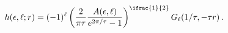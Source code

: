 \[\mathop{h\/}\nolimits\!\left(\epsilon,\ell;r\right)=(-1)^{\ell}\left(\frac{2}{%
\pi\tau}\frac{A(\epsilon,\ell)}{e^{2\pi/\tau}-1}\right)^{\ifrac{1}{2}}\mathop{%
G_{\ell}\/}\nolimits\!\left(1/\tau,-\tau r\right).\]